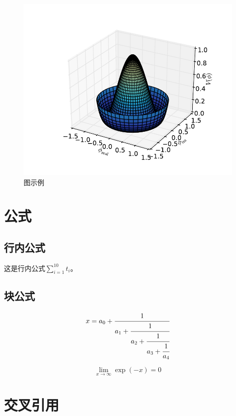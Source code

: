 \documentclass[titlepage,openany]{SHUugt}
\begin{document}
\begin{figure}
\centering
\includegraphics{figures/radial.pdf}
\caption{图示例\label{fig:radial}}
\end{figure}

\section{公式}\label{ux516cux5f0f}

\subsection{行内公式}\label{ux884cux5185ux516cux5f0f}

这是行内公式\(\sum_{i=1}^{10} t_i\)。

\subsection{块公式}\label{ux5757ux516cux5f0f}

\begin{equation}
  x = a_0 + \cfrac{1}{a_1
          + \cfrac{1}{a_2
          + \cfrac{1}{a_3 + \cfrac{1}{a_4} } } }
\end{equation}

\begin{equation}
  \lim_{x \to \infty} \exp(-x) = 0
\end{equation}

\section{交叉引用}\label{ux4ea4ux53c9ux5f15ux7528}
\end{document}
